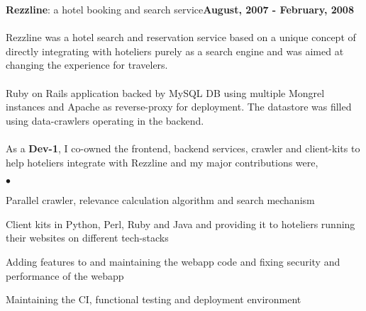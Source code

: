 \documentclass[margin,line]{res}
\newenvironment{list2}{
  \begin{list}{$\bullet$}{%
      \setlength{\itemsep}{0in}
      \setlength{\parsep}{0in} \setlength{\parskip}{0in}
      \setlength{\topsep}{0in} \setlength{\partopsep}{0in} 
      \setlength{\leftmargin}{0.2in}}}{\end{list}}
\begin{document}
\begin{resume}
{\bf Rezzline}: a hotel booking and search service\hfill {\bf August, 2007 - February, 2008}\\
\\
Rezzline was a hotel search and reservation service based on a unique concept of directly integrating with hoteliers purely as a search engine and was aimed at changing the experience for travelers.\\
\\
Ruby on Rails application backed by MySQL DB using multiple Mongrel instances and Apache as reverse-proxy for deployment. The datastore was filled using data-crawlers operating in the backend.\\
\\
As a {\bf Dev-1}, I co-owned the frontend, backend services, crawler and client-kits to help hoteliers integrate with Rezzline and my major contributions were,\\
\begin{list2}
\item Parallel crawler, relevance calculation algorithm and search mechanism
\item Client kits in Python, Perl, Ruby and Java and providing it to hoteliers running their websites on different tech-stacks
\item Adding features to and maintaining the webapp code and fixing security and performance of the webapp
\item Maintaining the CI, functional testing  and deployment environment
\end{list2}


\end{resume}
\end{document}
